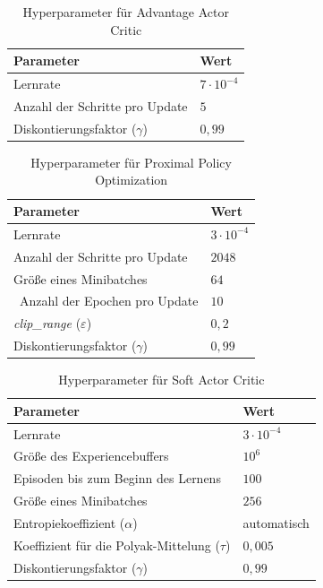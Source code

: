 \begin{table}[htb]
	\centering
	\begin{tabular}{p{} p{}}
		\toprule
		Parameter                                     & Wert\\\midrule
		Lernrate                                      & $7\cdot 10^{-4}$\\
		Anzahl der Schritte pro Update                & $5$\\
		Diskontierungsfaktor ($\gamma$)               & $0{,}99$\\\bottomrule
	\end{tabular}
	\caption{Hyperparameter für Advantage Actor Critic}
	\label{tab:A2CHyperparameter}
\end{table}

\begin{table}[htb]
	\centering
	\begin{tabular}{p{} p{}}
		\toprule
		Parameter                                     & Wert\\\midrule
		Lernrate                                      & $3 \cdot 10^{-4}$\\
		Anzahl der Schritte pro Update                & $2048$\\
		Größe eines Minibatches                       & $64$\\\
		Anzahl der Epochen pro Update                 & $10$\\
		\textit{clip\_range} ($\varepsilon$)          & $0{,}2$\\
		Diskontierungsfaktor ($\gamma$)               & $0{,}99$\\\bottomrule
	\end{tabular}
	\caption{Hyperparameter für Proximal Policy Optimization}
	\label{tab:PPOHyperparameters}
\end{table}

\begin{table}[htb]
	\centering
	\begin{tabular}{p{} p{}}
		\toprule
		Parameter                                     & Wert\\\midrule
		Lernrate                                      & $3 \cdot 10^{-4}$\\
		Größe des Experiencebuffers                   & $10^6$\\
		Episoden bis zum Beginn des Lernens           & $100$\\
		Größe eines Minibatches                       & $256$\\
		Entropiekoeffizient ($\alpha$)                & automatisch\\
		Koeffizient für die Polyak-Mittelung ($\tau$) & $0{,}005$\\
		Diskontierungsfaktor ($\gamma$)               & $0{,}99$\\\bottomrule
	\end{tabular}
	\caption{Hyperparameter für Soft Actor Critic}
	\label{tab:SACHyperparameters}
\end{table}

